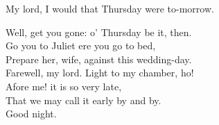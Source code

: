 \begin{speech}
My lord, I would that Thursday were to-morrow. \\

\end{speech}
\begin{speech}
Well, get you gone: o' Thursday be it, then. \\
Go you to Juliet ere you go to bed, \\
Prepare her, wife, against this wedding-day. \\
Farewell, my lord. Light to my chamber, ho! \\
Afore me! it is so very late, \\
That we may call it early by and by. \\
Good night.  \\
\end{speech}


